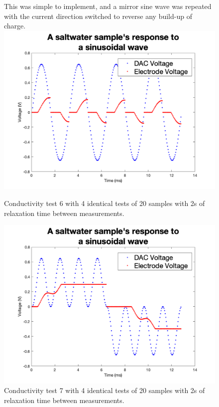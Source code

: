 \begin{figure}[ht]
    \begin{minipage}{0.5\textwidth}
        \centering
    
        This was simple to implement, and a mirror sine wave was repeated with the current direction switched to reverse any build-up of charge.
        \includegraphics[width=\textwidth]{Figures/Testing/TiAC1}
        \caption{Conductivity test 6 with 4 identical tests of 20 samples with 2s of relaxation time between measurements.}
        \label{fig:test17} %
    \end{minipage}
    \begin{minipage}{0.5\textwidth}
        \centering
        \includegraphics[width=\textwidth]{Figures/Testing/TiAC2}
        \caption{Conductivity test 7 with 4 identical tests of 20 samples with 2s of relaxation time between measurements.}
        \label{fig:test18} %
    \end{minipage}
\end{figure}

